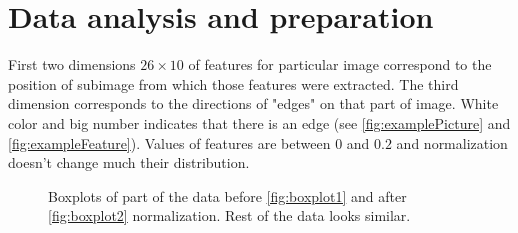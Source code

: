 \documentclass[]{report}
\begin{document}
\section{Data analysis and preparation}
  First two dimensions $26\times10$ of features for particular image correspond to the position of subimage from which those features were extracted. The third dimension corresponds to the directions of "edges" on that part of image. White color and big number indicates that there is an edge (see \ref{fig:examplePicture} and \ref{fig:exampleFeature}). Values of features are between $0$ and $0.2$ and normalization doesn't change much their distribution.
  \begin{figure}[!h]
  \center
  \;
  \caption{Boxplots of part of the data before \ref{fig:boxplot1} and after \ref{fig:boxplot2} normalization. Rest of the data looks similar.}
\end{figure}
  
\end{document}
